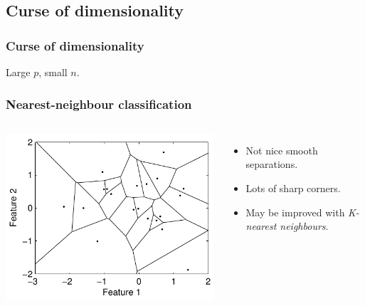 \documentclass{beamer}
\begin{document}

\subsection{Curse of dimensionality}

\begin{frame}
\frametitle{Curse of dimensionality}
\begin{center}
{\Huge Large $p$, small $n$.\par}
\end{center}
\end{frame}

\begin{frame}
\frametitle{Nearest-neighbour classification}
\begin{columns}[c]
\includegraphics[width=\textwidth]{voronoi}
\begin{itemize}
\item Not nice smooth separations.
\item Lots of sharp corners.
\item May be improved with \emph{K-nearest neighbours}.
\end{itemize}
\end{columns}
\end{frame}
\end{document}
